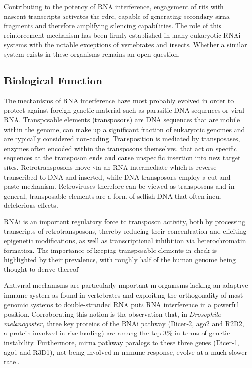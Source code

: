 Contributing to the potency of RNA interference, engagement of \gls{rits} with nascent transcripts activates the \gls{rdrc}, capable of generating secondary \gls{sirna} fragments and therefore amplifying silencing capabilities. The role of this reinforcement mechanism has been firmly established in many eukaryotic RNAi systems with the notable exceptions of vertebrates and insects. Whether a similar system exists in these organisms remains an open question.

\subsection{Biological Function}
The mechanisms of RNA interference have most probably evolved in order to protect against foreign genetic material such as parasitic DNA sequences or viral RNA. Transposable elements (transposons) are DNA sequences that are mobile within the genome, can make up a significant fraction of eukaryotic genomes and are typically considered non-coding. Transposition is mediated by transposases, enzymes often encoded within the transposons themselves, that act on specific sequences at the transposon ends and cause unspecific insertion into new target sites. Retrotransposons move via an RNA intermediate which is reverse transcribed to DNA and inserted, while DNA transposons employ a cut and paste mechanism. Retroviruses therefore can be viewed as transposons and in general, transposable elements are a form of selfish DNA that often incur deleterious effects.

RNAi is an important regulatory force to transposon activity, both by processing transcripts of retrotransposons, thereby reducing their concentration and eliciting epigenetic modifications, as well as transcriptional inhibition via heterochromatin formation. The importance of keeping transposable elements in check is highlighted by their prevalence, with roughly half of the human genome being thought to derive thereof.

Antiviral mechanisms are particularly important in organisms lacking an adaptive immune system as found in vertebrates and exploiting the orthogonality of most genomic systems to double-stranded RNA puts RNA interference in a powerful position. Corroborating this notion is the observation that, in \textit{Drosophila melanogaster}, three key proteins of the RNAi pathway (Dicer-2, \gls{ago}2 and R2D2, a protein involved in \gls{risc} loading) are among the top 3\% in terms of genetic instability. Furthermore, \gls{mirna} pathway paralogs to these three genes (Dicer-1, \gls{ago}1 and R3D1), not being involved in immune response, evolve at a much slower rate \citep{Obbard2009}.

